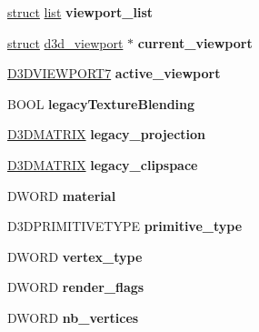 \begin{DoxyCompactItemize}
\hyperlink{interfacestruct}{struct} \hyperlink{classlist}{list} {\bfseries viewport\+\_\+list}
\item 
\mbox{\label{structd3d__device_a8ebcd8ee87d2459e34112323950ae8ff}} 
\hyperlink{interfacestruct}{struct} \hyperlink{structd3d__viewport}{d3d\+\_\+viewport} $\ast$ {\bfseries current\+\_\+viewport}
\item 
\mbox{\label{structd3d__device_ac40f1654866698278f1c2280509c576d}} 
\hyperlink{struct___d3_d_v_i_e_w_p_o_r_t7}{D3\+D\+V\+I\+E\+W\+P\+O\+R\+T7} {\bfseries active\+\_\+viewport}
\item 
\mbox{\label{structd3d__device_abe0b12391f1064fe5edfd2ac887abdc6}} 
B\+O\+OL {\bfseries legacy\+Texture\+Blending}
\item 
\mbox{\label{structd3d__device_a23b290f9e77c84bf058052c60a50e71c}} 
\hyperlink{struct___d3_d_m_a_t_r_i_x}{D3\+D\+M\+A\+T\+R\+IX} {\bfseries legacy\+\_\+projection}
\item 
\mbox{\label{structd3d__device_ae4b870a66204d04a073e7da9ad7d35fa}} 
\hyperlink{struct___d3_d_m_a_t_r_i_x}{D3\+D\+M\+A\+T\+R\+IX} {\bfseries legacy\+\_\+clipspace}
\item 
\mbox{\label{structd3d__device_ac0201bb453970becdab6bf1921f9fd92}} 
D\+W\+O\+RD {\bfseries material}
\item 
\mbox{\label{structd3d__device_a2d299d32c936bd8ffb69ac8b430a81f1}} 
D3\+D\+P\+R\+I\+M\+I\+T\+I\+V\+E\+T\+Y\+PE {\bfseries primitive\+\_\+type}
\item 
\mbox{\label{structd3d__device_aa59aae17ec0dc0453e7f7558d657d0bb}} 
D\+W\+O\+RD {\bfseries vertex\+\_\+type}
\item 
\mbox{\label{structd3d__device_a7a0d92edba6b1d0eccd241e68d5e92b5}} 
D\+W\+O\+RD {\bfseries render\+\_\+flags}
\item 
\mbox{\label{structd3d__device_a571a8639091675bbf36534ba8bd4e7e7}} 
D\+W\+O\+RD {\bfseries nb\+\_\+vertices}

\end{DoxyCompactItemize}
